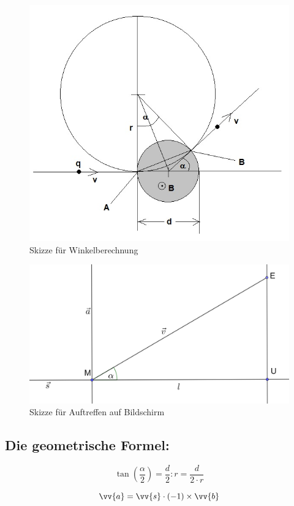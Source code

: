 \begin{figure}
    \centering
    \includegraphics[width=.75\textwidth]{fig/elektronenstrahl-ablenkung_101.jpg}
    \caption{Skizze für Winkelberechnung}
    \label{fig:ausBlog}
\end{figure}

\begin{figure}
    \centering
    \includegraphics[width=.75\textwidth]{fig/Bildschirm_Skizze.png}
    \caption{Skizze für Auftreffen auf Bildschirm}
    \label{fig:Schirm}
\end{figure}

\subsection{Die geometrische Formel:}
\begin{equation}
    \label{eq:tan}
    \tan(\frac{\alpha}{2}) = \frac{d}{2}:r = \frac{d}{2 \cdot r}
\end{equation}

\begin{equation}
    \label{eq:a}
    \vv{a} = \vv{s} \cdot (-1) \times \vv{b}
\end{equation}

